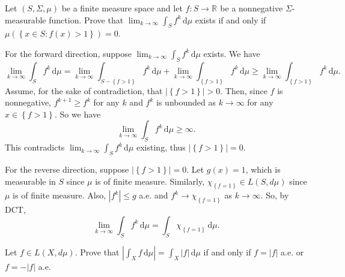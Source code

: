 \pagebreak

\begin{problem}{2}
  Let $\left( S, \Sigma, \mu \right)$ be a finite measure space and let $f : S \to \mathbb{R}^{} $ be a nonnegative $\Sigma$-measurable function.
  Prove that $\lim_{k \to \infty} \int_{S} \! f^{k} \, \mathrm{d}\mu $ exists if and only if \\
  $\mu\left( \left\{ x \in S : f(x) > 1 \right\} \right) = 0$.
\end{problem}
    
\begin{solution}
  For the forward direction, suppose $\lim_{k \to \infty} \int_{S} \! f^{k} \, \mathrm{d} \mu$ exists.
  We have 
  \[
    \lim_{k \to \infty} \int_{S} \! f^{k} \, \mathrm{d} \mu = \lim_{k \to \infty} \int_{S-\left\{ f > 1 \right\}} \! f^{k} \, \mathrm{d} \mu + \lim_{k \to \infty} \int_{\left\{ f > 1 \right\}} \! f^{k} \, \mathrm{d} \mu \geq \lim_{k \to \infty} \int_{\left\{ f > 1 \right\}} \! f^{k} \, \mathrm{d} \mu
  .\] 
  Assume, for the sake of contradiction, that $\left| \left\{ f > 1 \right\} \right| > 0$.
  Then, since $f$ is nonnegative, $f^{k+1} \geq f^{k}$ for any $k$ and $f^{k}$ is unbounded as $k \to \infty$ for any $x \in \left\{ f > 1 \right\}$.
  So we have
  \[
  \lim_{k \to \infty} \int_{S} \! f^{k} \, \mathrm{d} \mu \geq \infty 
  .\] 
  This contradicts $\lim_{k \to \infty} \int_{S} \! f^{k} \, \mathrm{d} \mu$ existing, thus $\left| \left\{ f > 1 \right\} \right| = 0$.

  For the reverse direction, suppose $\left| \left\{ f > 1 \right\} \right| = 0$.
  Let $g(x) = 1$, which is measurable in $S$ since $\mu$ is of finite measure.
  Similarly, $\chi_{\left\{ f = 1 \right\}} \in L\left( S, d \mu \right)$ since $\mu$ is of finite measure.
  Also, $\left| f^{k} \right| \leq g$ a.e. and $f^{k} \to \chi_{\left\{ f = 1 \right\}}$ as $k \to \infty$.
  So, by DCT,
  \[
  \lim_{k \to \infty} \int_{S} \! f^{k} \, \mathrm{d} \mu = \int_{S} \! \chi_{\left\{ f = 1 \right\}} \, \mathrm{d} \mu  
  .\] 
\end{solution}

\pagebreak

\begin{problem}{3}
  Let $f \in L\left( X,d \mu \right)$. Prove that $\left| \int_{X} \! f \, \mathrm{d}\mu  \right| = \int_{X} \! \left| f \right| \, \mathrm{d}\mu $ if and only if $f = \left| f \right|$ a.e. or $f = - \left| f \right|$ a.e.
\end{problem}

